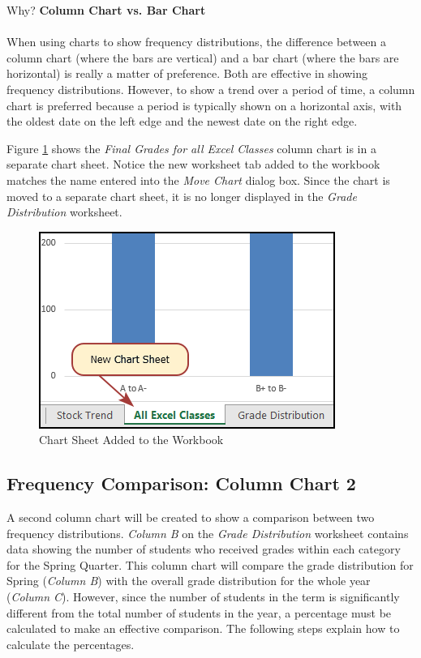 \begin{center}
	\begin{infobox}{Why?}
		\textbf{Column Chart vs. Bar Chart}
		\\
		\\
		When using charts to show frequency distributions, the difference between a column chart (where the bars are vertical) and a bar chart (where the bars are horizontal) is really a matter of preference. Both are effective in showing frequency distributions. However, to show a trend over a period of time, a column chart is preferred because a period is typically shown on a horizontal axis, with the oldest date on the left edge and the newest date on the right edge.
	\end{infobox}
\end{center}

Figure \ref{04:fig16} shows the \textit{Final Grades for all Excel Classes} column chart is in a separate chart sheet. Notice the new worksheet tab added to the workbook matches the name entered into the \textit{Move Chart} dialog box. Since the chart is moved to a separate chart sheet, it is no longer displayed in the \textit{Grade Distribution} worksheet.

\begin{figure}[H]
	\centering
	\includegraphics[width=\maxwidth{.65\linewidth}]{gfx/ch04_fig16}
	\caption{Chart Sheet Added to the Workbook}
	\label{04:fig16}
\end{figure}

\subsection{Frequency Comparison: Column Chart 2}

A second column chart will be created to show a comparison between two frequency distributions. \textit{Column B} on the \textit{Grade Distribution} worksheet contains data showing the number of students who received grades within each category for the Spring Quarter. This column chart will compare the grade distribution for Spring (\textit{Column B}) with the overall grade distribution for the whole year (\textit{Column C}). However, since the number of students in the term is significantly different from the total number of students in the year, a percentage must be calculated to make an effective comparison. The following steps explain how to calculate the percentages.

